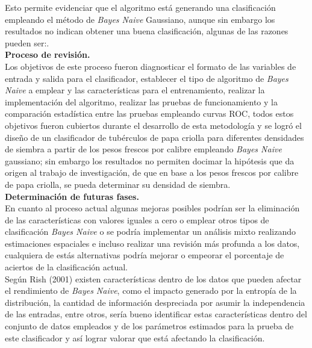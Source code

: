 Esto permite evidenciar que  el algoritmo está generando una clasificación empleando el método de
 \textit{Bayes Naive} Gaussiano, aunque sin embargo los resultados no indican obtener una buena clasificación, algunas de las razones pueden ser:.\\

\noindent
\textbf{Proceso de revisión.}\\

Los objetivos de este proceso fueron diagnosticar el formato de las
variables de entrada y salida para el clasificador, establecer el tipo de
algoritmo de \textit{Bayes Naive} a emplear y las características para el entrenamiento,
realizar la implementación del algoritmo, realizar las pruebas de funcionamiento
y la comparación estadística entre las pruebas empleando curvas ROC, todos estos objetivos fueron cubiertos durante el
desarrollo de esta metodología y se logró el diseño de un clasificador de tubérculos
de papa criolla para diferentes densidades de siembra a partir de los pesos frescos
por calibre empleando \textit{Bayes Naive} gaussiano; sin embargo los resultados no permiten docimar la hipótesis que da origen al trabajo de investigación,  de que en base a los pesos frescos por calibre de papa criolla, se pueda determinar su densidad de siembra.\\

\noindent
\textbf{Determinación de futuras fases.}\\

En cuanto al proceso actual algunas mejoras posibles podrían ser la eliminación
de las características con valores iguales a cero o emplear otros tipos de clasificación \textit{Bayes Naive} o se podría implementar un análisis mixto realizando estimaciones  espaciales e incluso realizar una revisión más profunda a los datos, cualquiera de estás alternativas podría mejorar o empeorar el porcentaje de aciertos de la clasificación actual.\\

Según Rish (2001) existen características dentro de los datos que pueden afectar el
rendimiento de \textit{Bayes Naive}, como el impacto generado por la entropía de la distribución, la
cantidad de información despreciada por asumir la independencia de las entradas, entre otros,
sería bueno identificar estas características dentro del conjunto de datos empleados y de los parámetros estimados para la prueba de
este clasificador y así lograr valorar que está afectando la clasificación.